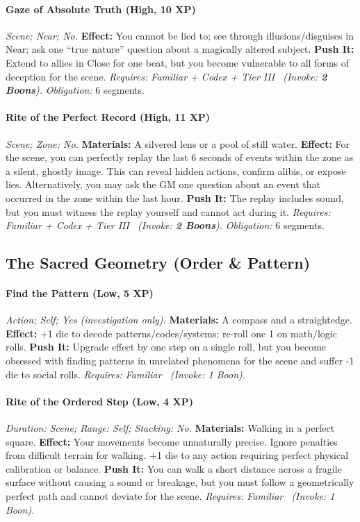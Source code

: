 \paragraph{Gaze of Absolute Truth (High, 10 XP)} \emph{Scene; Near; No.}
\textbf{Effect:} You cannot be lied to; see through illusions/disguises in Near; ask one ``true nature'' question about a magically altered subject.
\textbf{Push It:} Extend to allies in Close for one beat, but you become vulnerable to all forms of deception for the scene.
\emph{Requires: Familiar + Codex + Tier III \ (\textit{Invoke:} \textbf{2 Boons}).}
\emph{Obligation:} 6 segments.

\paragraph{Rite of the Perfect Record (High, 11 XP)} \emph{Scene; Zone; No.}
\textbf{Materials:} A silvered lens or a pool of still water.
\textbf{Effect:} For the scene, you can perfectly replay the last 6 seconds of events within the zone as a silent, ghostly image. This can reveal hidden actions, confirm alibis, or expose lies. Alternatively, you may ask the GM one question about an event that occurred in the zone within the last hour.
\textbf{Push It:} The replay includes sound, but you must witness the replay yourself and cannot act during it.
\emph{Requires: Familiar + Codex + Tier III \ (\textit{Invoke:} \textbf{2 Boons}).}
\emph{Obligation:} 6 segments.

\subsection{The Sacred Geometry (Order \& Pattern)}
\paragraph{Find the Pattern (Low, 5 XP)} \emph{Action; Self; Yes (investigation only).}
\textbf{Materials:} A compass and a straightedge.
\textbf{Effect:} +1 die to decode patterns/codes/systems; re-roll one 1 on math/logic rolls.
\textbf{Push It:} Upgrade effect by one step on a single roll, but you become obsessed with finding patterns in unrelated phenomena for the scene and suffer -1 die to social rolls.
\emph{Requires: Familiar \ (\textit{Invoke:} 1 Boon).}
\paragraph{Rite of the Ordered Step (Low, 4 XP)} \emph{Duration: Scene; Range: Self; Stacking: No.}
\textbf{Materials:} Walking in a perfect square.
\textbf{Effect:} Your movements become unnaturally precise. Ignore penalties from difficult terrain for walking. +1 die to any action requiring perfect physical calibration or balance.
\textbf{Push It:} You can walk a short distance across a fragile surface without causing a sound or breakage, but you must follow a geometrically perfect path and cannot deviate for the scene.
\emph{Requires: Familiar \ (\textit{Invoke:} 1 Boon).}
